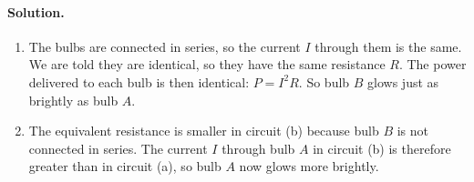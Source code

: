 \documentclass[11pt]{article}
\newenvironment{solution}
{
    \paragraph{Solution.}
    \ignorespaces
}
{
    \bigskip
}
\begin{document}
\begin{solution}
	\begin{enumerate}
		\item The bulbs are connected in series, so the current $I$ through them is the same.  We are told they are identical, so they have the same resistance $R$.  The power delivered to each bulb is then identical: $P = I^2 R$.  So bulb $B$ glows just as brightly as bulb $A$.
		\item The equivalent resistance is smaller in circuit (b) because bulb $B$ is not connected in series.  The current $I$ through bulb $A$ in circuit (b) is therefore greater than in circuit (a), so bulb $A$ now glows more brightly.
	\end{enumerate}
\end{solution}

\vfill

\newcommand{\Req}{R_\text{eq}}
\newcommand{\Rtot}{R_\text{tot}}
\end{document}
